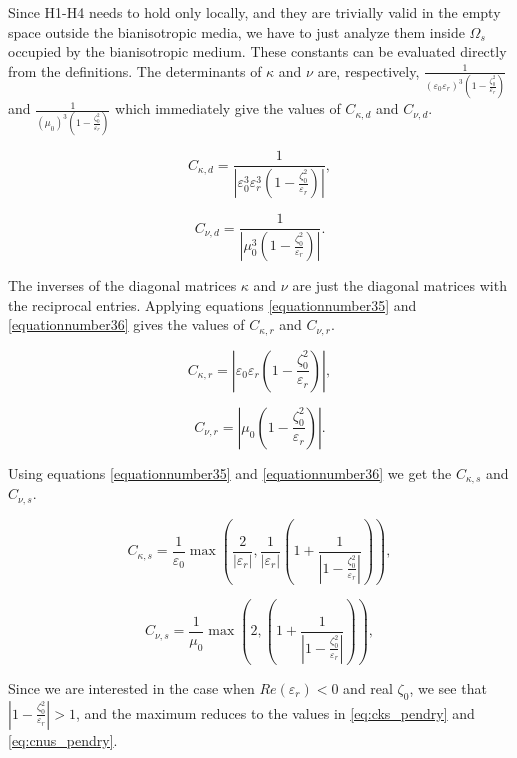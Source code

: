 Since H1-H4 needs to hold only locally, and they are trivially 
valid in the empty space outside the bianisotropic media, 
we have to just analyze them inside $\Omega_s$ occupied by the bianisotropic medium.
These constants can be evaluated directly from the definitions. 
The determinants of $\kappa$ and $\nu$ are, respectively, 
$\frac{1}{(\varepsilon_0 \varepsilon_r)^3(1-\frac{\zeta_0^2}{\varepsilon_r})}$ and
$\frac{1}{(\mu_0)^3(1-\frac{\zeta_0^2}{\varepsilon_r})}$  which immediately give the values of  $C_{\kappa,d}$ and $C_{\nu,d}$.

\begin{equation}
C_{\kappa,d} =  \frac{1}{|\varepsilon_0^3\varepsilon_r^3(1 - \frac{\zeta_0^2}{\varepsilon_r})|}, 
\end{equation}

\begin{equation}
C_{\nu,d} =  \frac{1}{|\mu_0^3(1 - \frac{\zeta_0^2}{\varepsilon_r})|}.
\end{equation}

The inverses of the diagonal matrices $\kappa$ and $\nu$ are just the 
diagonal matrices with the reciprocal entries.
Applying equations \eqref{equationnumber35} and \eqref{equationnumber36} gives the values of $C_{\kappa,r}$ and $C_{\nu,r}$.

\begin{equation}
C_{\kappa,r} =  |\varepsilon_0\varepsilon_r (1 - \frac{\zeta_0^2}{\varepsilon_r})|,
\end{equation}

\begin{equation}
C_{\nu,r} =  |\mu_0 (1 - \frac{\zeta_0^2}{\varepsilon_r})|. 
\end{equation}

Using equations \eqref{equationnumber35} and \eqref{equationnumber36} we get the $C_{\kappa,s}$ and $C_{\nu,s}$.

\begin{equation}
C_{\kappa,s} =  \frac{1}{\varepsilon_0} \max(\frac{2}{|\varepsilon_r|}, \frac{1}{|\varepsilon_r|}(1 + \frac{1}{|1 - \frac{\zeta_0^2}{\varepsilon_r}|})),
\end{equation}

\begin{equation}
C_{\nu,s} = \frac{1}{\mu_0} \max(2, (1 + \frac{1}{|1 - \frac{\zeta_0^2}{\varepsilon_r}|})),
\end{equation}

Since we are interested in the case when $Re(\varepsilon_r) < 0$ and real $\zeta_0$, 
 we see that $|1 - \frac{\zeta_0^2}{\varepsilon_r}| > 1$,   and the maximum reduces to 
the values in \eqref{eq:cks_pendry} and \eqref{eq:cnus_pendry}.

